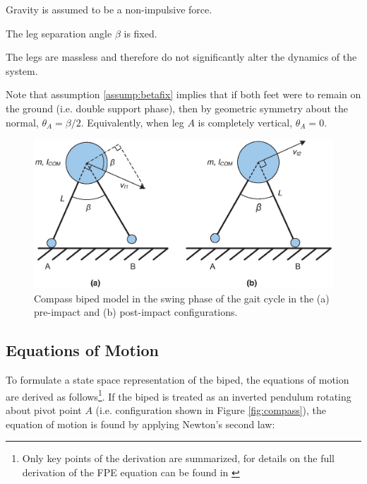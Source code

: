 \begin{assumption}
	Gravity is assumed to be a non-impulsive force. 
\end{assumption}

\begin{assumption} \label{assump:betafix}
	The leg separation angle $\beta$ is fixed.
\end{assumption}

\begin{assumption} \label{assump:massless}
	The legs are massless and therefore do not significantly alter the dynamics of the system. 
\end{assumption}

\hrulefill

Note that assumption \ref{assump:betafix} implies that if both feet were to remain on the ground (i.e. double support phase), then by geometric symmetry about the normal, $\theta _A = \beta/2$. Equivalently, when leg $A$ is completely vertical, $\theta _A = 0$.

\begin{figure}[!h]
	\centering
    \includegraphics[scale=0.6]{fig/fpe/fig2.eps}
  	\caption{Compass biped model in the swing phase of the gait cycle in the (a) pre-impact and (b) post-impact configurations.}
	\label{fig:prepost}
\end{figure}

\subsection{Equations of Motion}

To formulate a state space representation of the biped, the equations of motion are derived as follows\footnote{Only key points of the derivation are summarized, for details on the full derivation of the FPE equation can be found in \cite{Wight:2008vt,Millard:2011vk}}. If the biped is treated as an inverted pendulum rotating about pivot point $A$ (i.e. configuration shown in Figure  \ref{fig:compass}), the equation of motion is found by applying Newton's second law:

